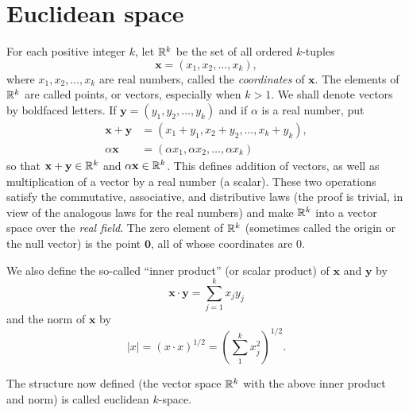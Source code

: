 \section{Euclidean space}

\begin{mydef}
    \label{mydef:1.36}
    For each positive integer $k$, 
    let ${\protect\mathbb R}^k$ be the set of all ordered $k$-tuples
    \begin{equation*}
        \mathbf{x} = \left(x_1,x_2,\dots,x_k\right),
    \end{equation*}
    where $x_1,x_2,\dots,x_k$ are real numbers, called the \emph{coordinates} of $\mathbf{x}$. 
    The elements of ${\protect\mathbb R}^k$ are called points, or vectors, 
    especially when $k > 1$. We shall denote vectors
    by boldfaced letters. 
    If $\mathbf{y} = \left(y_1,y_2,\dots,y_k\right)$ 
    and if $\alpha$ is a real number, put
    \begin{align*}
        \mathbf{x} + \mathbf{y} &= \left(x_1+y_1,x_2+y_2,\dots,x_k+y_k\right),\\
        \alpha\mathbf{x}  &= \left(\alpha x_1,\alpha x_2,\dots,\alpha x_k\right)
    \end{align*}
    so that $\mathbf{x} +\mathbf{y} \in {\protect\mathbb R}^k$ and $\alpha\mathbf{x} \in {\protect\mathbb R}^k$. 
    This defines addition of vectors, 
    as well as multiplication of a vector by a real number (a scalar). 
    These two operations satisfy the commutative, associative, 
    and distributive laws 
    (the proof is trivial, in view of the analogous laws for the real numbers) 
    and make ${\protect\mathbb R}^k$ into a vector space over the \emph{real field}. 
    The zero element of ${\protect\mathbb R}^k$ (sometimes called the origin or the null vector) is the point $\mathbf{0}$, 
    all of whose coordinates are $0$.

    We also define the so-called ``inner product'' (or scalar product) of $\mathbf{x}$ and $\mathbf{y}$ by
    \begin{equation*}
        \mathbf{x}\cdot\mathbf{y} = \sum_{j=1}^{k}x_j y_j
    \end{equation*}
    and the norm of $\mathbf{x}$ by
    \begin{equation*}
        |x| = (x\cdot x)^{1/2} = \left( \sum_{1}^{k} x_j^2 \right)^{1/2}.
    \end{equation*}

    The structure now defined (the vector space ${\protect\mathbb R}^k$ with the above inner product and norm) is called euclidean $k$-space.
\end{mydef}

